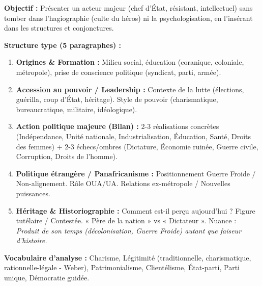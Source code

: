 \documentclass[11pt]{article}
\newcommand{\cle}[1]{{\popxbold\color{popdark}#1}}
\begin{document}
\begin{methode}
\textbf{Objectif :} Présenter un acteur majeur (chef d'État, résistant, intellectuel) sans tomber dans l'hagiographie (culte du héros) ni la psychologisation, en l'insérant dans les structures et conjonctures.
\par \textbf{Structure type (5 paragraphes) :}
\begin{enumerate}
    \item \textbf{Origines \& Formation :} Milieu social, éducation (coranique, coloniale, métropole), prise de conscience politique (syndicat, parti, armée).
    \item \textbf{Accession au pouvoir / Leadership :} Contexte de la lutte (élections, guérilla, coup d'État, héritage). Style de pouvoir (charismatique, bureaucratique, militaire, idéologique).
    \item \textbf{Action politique majeure (Bilan) :} 2-3 réalisations concrètes (Indépendance, Unité nationale, Industrialisation, Éducation, Santé, Droits des femmes) + 2-3 échecs/ombres (Dictature, Économie ruinée, Guerre civile, Corruption, Droits de l'homme).
    \item \textbf{Politique étrangère / Panafricanisme :} Positionnement Guerre Froide / Non-alignement. Rôle OUA/UA. Relations ex-métropole / Nouvelles puissances.
    \item \textbf{Héritage \& Historiographie :} Comment est-il perçu aujourd'hui ? Figure tutélaire / Contestée. « Père de la nation » vs « Dictateur ». Nuance : \emph{Produit de son temps (décolonisation, Guerre Froide) autant que faiseur d'histoire.}
\end{enumerate}
\par \textbf{Vocabulaire d'analyse :} \cle{Charisme}, \cle{Légitimité} (traditionnelle, charismatique, rationnelle-légale - Weber), \cle{Patrimonialisme}, \cle{Clientélisme}, \cle{État-parti}, \cle{Parti unique}, \cle{Démocratie guidée}.
\end{methode}
\end{document}
